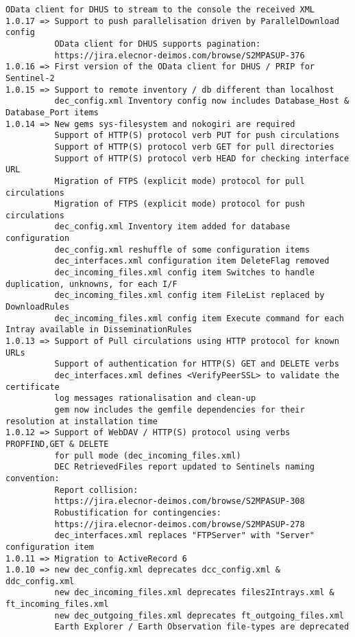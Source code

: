 \documentclass[dec_sum_main.tex]{subfiles}
\begin{document}
\begin{Verbatim}[tabsize=4]
          OData client for DHUS to stream to the console the received XML
1.0.17 => Support to push parallelisation driven by ParallelDownload config
          OData client for DHUS supports pagination:
          https://jira.elecnor-deimos.com/browse/S2MPASUP-376
1.0.16 => First version of the OData client for DHUS / PRIP for Sentinel-2
1.0.15 => Support to remote inventory / db different than localhost
          dec_config.xml Inventory config now includes Database_Host & Database_Port items
1.0.14 => New gems sys-filesystem and nokogiri are required
          Support of HTTP(S) protocol verb PUT for push circulations
          Support of HTTP(S) protocol verb GET for pull directories
          Support of HTTP(S) protocol verb HEAD for checking interface URL
          Migration of FTPS (explicit mode) protocol for pull circulations
          Migration of FTPS (explicit mode) protocol for push circulations
          dec_config.xml Inventory item added for database configuration
          dec_config.xml reshuffle of some configuration items
          dec_interfaces.xml configuration item DeleteFlag removed
          dec_incoming_files.xml config item Switches to handle duplication, unknowns, for each I/F
          dec_incoming_files.xml config item FileList replaced by DownloadRules
          dec_incoming_files.xml config item Execute command for each Intray available in DisseminationRules
1.0.13 => Support of Pull circulations using HTTP protocol for known URLs
          Support of authentication for HTTP(S) GET and DELETE verbs
          dec_interfaces.xml defines <VerifyPeerSSL> to validate the certificate
          log messages rationalisation and clean-up
          gem now includes the gemfile dependencies for their resolution at installation time
1.0.12 => Support of WebDAV / HTTP(S) protocol using verbs PROPFIND,GET & DELETE
          for pull mode (dec_incoming_files.xml)
          DEC RetrievedFiles report updated to Sentinels naming convention:
          Report collision:
          https://jira.elecnor-deimos.com/browse/S2MPASUP-308
          Robustification for contingencies:
          https://jira.elecnor-deimos.com/browse/S2MPASUP-278
          dec_interfaces.xml replaces "FTPServer" with "Server" configuration item
1.0.11 => Migration to ActiveRecord 6
1.0.10 => new dec_config.xml deprecates dcc_config.xml & ddc_config.xml
          new dec_incoming_files.xml deprecates files2Intrays.xml & ft_incoming_files.xml
          new dec_outgoing_files.xml deprecates ft_outgoing_files.xml
          Earth Explorer / Earth Observation file-types are deprecated

\end{Verbatim}
\end{document}
